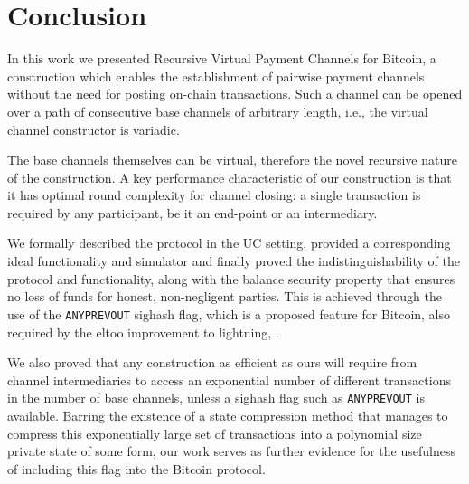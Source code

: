 \section{Conclusion}

  In this work we presented Recursive Virtual Payment Channels for Bitcoin,
  a construction which enables the establishment of pairwise payment channels without the need for
  posting on-chain transactions. Such a channel can be opened over a path of consecutive base
  channels of arbitrary length, i.e., the virtual channel constructor is variadic. 

  The base channels themselves
  can be virtual, therefore the novel recursive nature of the construction. 
  A key performance characteristic of our construction is that it has optimal
  round complexity for channel closing: a single transaction is required
  by any participant, be it an end-point or an intermediary. 
  
  We formally described the protocol in the UC setting, provided a corresponding
  ideal functionality and simulator and finally proved the indistinguishability
  of the protocol and functionality, along with the balance security property
  that ensures no loss of funds for honest, non-negligent parties. This is
  achieved through the use of the \texttt{ANYPREVOUT} sighash flag, which is a
  proposed feature for Bitcoin, also required by the eltoo improvement to lightning, 
  \cite{eltoo}. 

  We also proved that any construction as efficient 
  as ours
  will require from channel intermediaries to access 
  an exponential number of different transactions in the number of base channels,
  unless a sighash flag such as \texttt{ANYPREVOUT} is available. Barring the existence
  of a state compression method that manages to compress this exponentially large
  set of transactions into a polynomial size private state of some form, our
 work serves as further evidence for the usefulness of
  including this flag into the Bitcoin protocol. 

\newpage